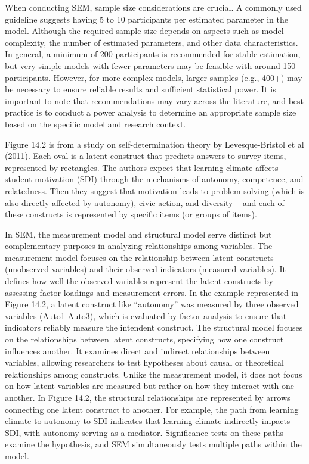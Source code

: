 \documentclass[
  letterpaper,
  DIV=11,
  numbers=noendperiod]{scrreprt}
\begin{document}
When conducting SEM, sample size considerations are crucial. A commonly
used guideline suggests having 5 to 10 participants per estimated
parameter in the model. Although the required sample size depends on
aspects such as model complexity, the number of estimated parameters,
and other data characteristics. In general, a minimum of 200
participants is recommended for stable estimation, but very simple
models with fewer parameters may be feasible with around 150
participants. However, for more complex models, larger samples (e.g.,
400+) may be necessary to ensure reliable results and sufficient
statistical power. It is important to note that recommendations may vary
across the literature, and best practice is to conduct a power analysis
to determine an appropriate sample size based on the specific model and
research context.

Figure 14.2 is from a study on self-determination theory by
Levesque-Bristol et al (2011). Each oval is a latent construct that
predicts answers to survey items, represented by rectangles. The authors
expect that learning climate affects student motivation (SDI) through
the mechanisms of autonomy, competence, and relatedness. Then they
suggest that motivation leads to problem solving (which is also directly
affected by autonomy), civic action, and diversity -- and each of these
constructs is represented by specific items (or groups of items).

In SEM, the measurement model and structural model serve distinct but
complementary purposes in analyzing relationships among variables. The
measurement model focuses on the relationship between latent constructs
(unobserved variables) and their observed indicators (measured
variables). It defines how well the observed variables represent the
latent constructs by assessing factor loadings and measurement errors.
In the example represented in Figure 14.2, a latent construct like
``autonomy'' was measured by three observed variables (Auto1-Auto3),
which is evaluated by factor analysis to ensure that indicators reliably
measure the intendent construct. The structural model focuses on the
relationships between latent constructs, specifying how one construct
influences another. It examines direct and indirect relationships
between variables, allowing researchers to test hypotheses about causal
or theoretical relationships among constructs. Unlike the measurement
model, it does not focus on how latent variables are measured but rather
on how they interact with one another. In Figure 14.2, the structural
relationships are represented by arrows connecting one latent construct
to another. For example, the path from learning climate to autonomy to
SDI indicates that learning climate indirectly impacts SDI, with
autonomy serving as a mediator. Significance tests on these paths
examine the hypothesis, and SEM simultaneously tests multiple paths
within the model.
\end{document}
